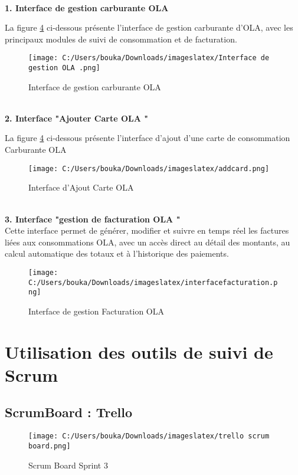 \documentclass[a4paper,11pt]{report}
\begin{document}
\textbf{      \\ 1. Interface de gestion carburante OLA}

La figure \ref{fig:clone-result} ci-dessous présente l’interface de gestion carburante d’OLA, avec les principaux modules de suivi de consommation et de facturation.

\begin{figure}[H]
  \centering
  \texttt{[image: C:/Users/bouka/Downloads/imageslatex/Interface de gestion OLA .png]}
  \caption{Interface de gestion carburante OLA}
  \label{fig:clone-result}
\end{figure}




\textbf{      \\ 2. Interface  "Ajouter Carte OLA "}

La figure \ref{fig:clone-result} ci-dessous présente l’interface d'ajout d'une carte de consommation Carburante OLA

\begin{figure}[H]
  \centering
  \texttt{[image: C:/Users/bouka/Downloads/imageslatex/addcard.png]}
  \caption{Interface d'Ajout Carte OLA}
  \label{fig:clone-result}
\end{figure}





\textbf{      \\ 3. Interface  "gestion de facturation OLA "}
\\
Cette interface permet de générer, modifier et suivre en temps réel les factures liées aux consommations OLA, avec un accès direct au détail des montants, au calcul automatique des totaux et à l’historique des paiements.
\begin{figure}[H]
  \centering
  \texttt{[image: C:/Users/bouka/Downloads/imageslatex/interfacefacturation.png]}
  \caption{Interface de gestion Facturation OLA}
  \label{fig:clone-result}
\end{figure}


\section{Utilisation des outils de suivi de Scrum}

\subsection{ScrumBoard : Trello}


\begin{figure}[H]
  \centering
  \texttt{[image: C:/Users/bouka/Downloads/imageslatex/trello scrum board.png]}
  \caption{Scrum Board Sprint 3}
  \label{fig:clone-result}
\end{figure}
\end{document}
